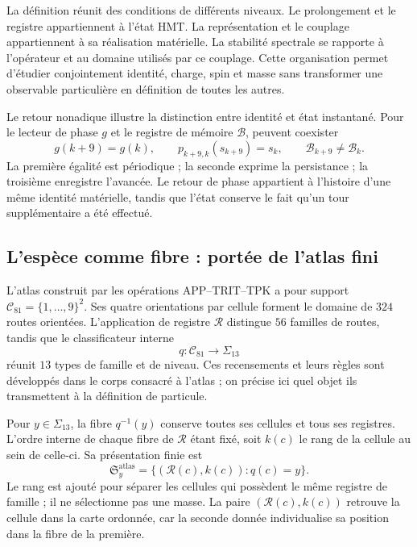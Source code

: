 La définition réunit des conditions de différents niveaux. Le prolongement
et le registre appartiennent à l’état HMT. La représentation et le
couplage appartiennent à sa réalisation matérielle. La stabilité
spectrale se rapporte à l’opérateur et au domaine utilisés par ce
couplage. Cette organisation permet d’étudier conjointement identité,
charge, spin et masse sans transformer une observable particulière en définition
de toutes les autres.

Le retour nonadique illustre la distinction entre identité et état
instantané. Pour le lecteur de phase $g$ et le registre de mémoire
$\mathcal B$, peuvent coexister
\begin{equation}
 g(k+9)=g(k),\qquad
 p_{k+9,k}(s_{k+9})=s_k,\qquad
 \mathcal B_{k+9}\ne\mathcal B_k.
 \label{vi:vi:eq:persistencia-fase-memoria}
\end{equation}
La première égalité est périodique ; la seconde exprime la persistance ; la
troisième enregistre l’avancée. Le retour de phase appartient à l’histoire
d’une même identité matérielle, tandis que l’état conserve le fait qu’un
tour supplémentaire a été effectué.

\subsection{L’espèce comme fibre : portée de l’atlas fini}
\label{vi:vi:subsec:especie-fibra}

L’atlas construit par les opérations APP--TRIT--TPK a pour support
$\mathcal C_{81}=\{1,\ldots,9\}^2$. Ses quatre orientations par
cellule forment le domaine de $324$ routes orientées. L’application de
registre $\mathcal R$ distingue $56$ familles de routes, tandis que le
classificateur interne
\begin{equation}
 q:\mathcal C_{81}\longrightarrow\Sigma_{13}
 \label{vi:vi:eq:clasificador-especies}
\end{equation}
réunit $13$ types de famille et de niveau. Ces recensements et leurs règles sont
développés dans le corps consacré à l’atlas ; on précise ici quel objet
ils transmettent à la définition de particule.

Pour $y\in\Sigma_{13}$, la fibre $q^{-1}(y)$ conserve toutes ses
cellules et tous ses registres. L’ordre interne de chaque fibre de
$\mathcal R$ étant fixé, soit $k(c)$ le rang de la cellule au sein de celle-ci. Sa
présentation finie est
\begin{equation}
 \mathfrak S_y^{\mathrm{atlas}}
 =\{(\mathcal R(c),k(c)):q(c)=y\}.
 \label{vi:vi:eq:multiseccion-atlas}
\end{equation}
Le rang est ajouté pour séparer les cellules qui possèdent le même registre de
famille ; il ne sélectionne pas une masse. La paire $(\mathcal R(c),k(c))$
retrouve la cellule dans la carte ordonnée, car la seconde donnée
individualise sa position dans la fibre de la première.

